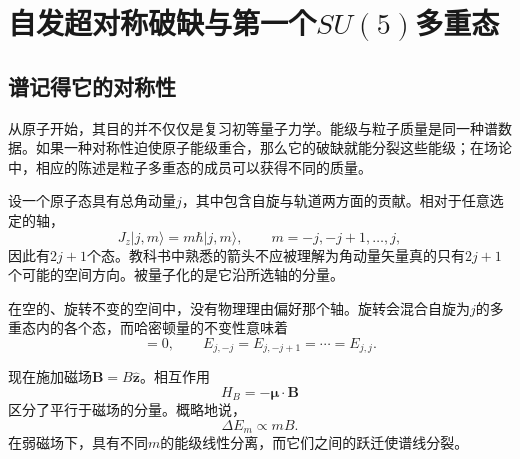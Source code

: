 \chapter{自发超对称破缺与第一个\texorpdfstring{\(SU(5)\)}{SU(5)}多重态}


\section{谱记得它的对称性}

从原子开始，其目的并不仅仅是复习初等量子力学。能级与粒子质量是同一种谱数据。如果一种对称性迫使原子能级重合，那么它的破缺就能分裂这些能级；在场论中，相应的陈述是粒子多重态的成员可以获得不同的质量。

设一个原子态具有总角动量\(j\)，其中包含自旋与轨道两方面的贡献。相对于任意选定的轴，
\begin{equation}
J_z|j,m\rangle=m\hbar|j,m\rangle,
\qquad
m=-j,-j+1,\ldots,j,
\end{equation}
因此有\(2j+1\)个态。教科书中熟悉的箭头不应被理解为角动量矢量真的只有\(2j+1\)个可能的空间方向。被量子化的是它沿所选轴的分量。

在空的、旋转不变的空间中，没有物理理由偏好那个轴。旋转会混合自旋为\(j\)的多重态内的各个态，而哈密顿量的不变性意味着
\begin{equation}
[H,\mathbf J]=0,
\qquad
E_{j,-j}=E_{j,-j+1}=\cdots=E_{j,j}.
\label{eq:l9-degeneracy}
\end{equation}

\begin{classroomqa}
\end{classroomqa}

现在施加磁场\(\mathbf B=B\hat{\mathbf z}\)。相互作用
\begin{equation}
H_B=-\boldsymbol{\mu}\cdot\mathbf B
\end{equation}
区分了平行于磁场的分量。概略地说，
\begin{equation}
\Delta E_m\propto mB.
\label{eq:l9-zeeman}
\end{equation}
在弱磁场下，具有不同\(m\)的能级线性分离，而它们之间的跃迁使谱线分裂。

